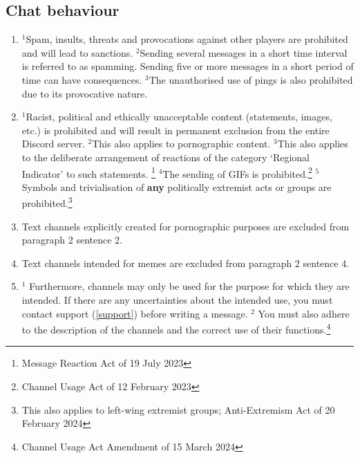 \documentclass{article}
\begin{document}
\subsection{Chat behaviour}\label{verhalten}
\begin{enumerate}[(1)]
	\item $^{1}$Spam, insults, threats and provocations against other players are prohibited and will lead to sanctions. $^{2}$Sending several messages in a short time interval is referred to as spamming. Sending five or more messages in a short period of time can have consequences. $^{3}$The unauthorised use of pings is also prohibited due to its provocative nature.
	\item $^{1}$Racist, political and ethically unacceptable content (statements, images, etc.) is prohibited and will result in permanent exclusion from the entire Discord server. $^{2}$This also applies to pornographic content. $^{3}$This also applies to the deliberate arrangement of reactions of the category `Regional Indicator' to such statements. \footnote{Message Reaction Act of 19 July 2023} $^{4}$The sending of GIFs is prohibited.\footnote{Channel Usage Act of 12 February 2023} $^{5}$ Symbols and trivialisation of \textbf{any} politically extremist acts or groups are prohibited.\footnote{This also applies to left-wing extremist groups; Anti-Extremism Act of 20 February 2024}
	\item Text channels explicitly created for pornographic purposes are excluded from paragraph 2 sentence 2.
	\item Text channels intended for memes are excluded from paragraph 2 sentence 4.
	\item $^{1}$ Furthermore, channels may only be used for the purpose for which they are intended. If there are any uncertainties about the intended use, you must contact support (\ref{support}) before writing a message. 
		  $^{2}$ You must also adhere to the description of the channels and the correct use of their functions.\footnote{Channel Usage Act Amendment of 15 March 2024}
\end{enumerate}
\end{document}

